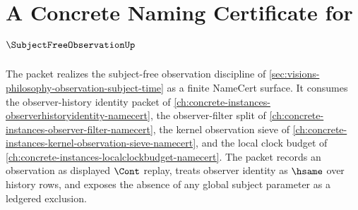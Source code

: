 \chapter{A Concrete Naming Certificate for $\SubjectFreeObservationUp$}
\label{ch:concrete-instances-subject-free-observation-namecert}

The \SubjectFreeObservationUp packet realizes the subject-free observation discipline of \autoref{sec:visions-philosophy-observation-subject-time} as a finite NameCert surface. It consumes the observer-history identity packet of \autoref{ch:concrete-instances-observerhistoryidentity-namecert}, the observer-filter split of \autoref{ch:concrete-instances-observer-filter-namecert}, the kernel observation sieve of \autoref{ch:concrete-instances-kernel-observation-sieve-namecert}, and the local clock budget of \autoref{ch:concrete-instances-localclockbudget-namecert}. The packet records an observation as displayed $\Cont$ replay, treats observer identity as $\hsame$ over history rows, and exposes the absence of any global subject parameter as a ledgered exclusion.

